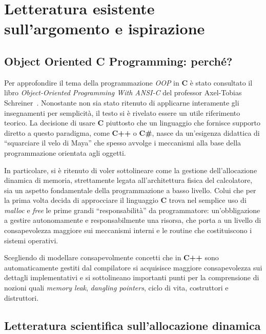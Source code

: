 \chapter{Letteratura esistente sull'argomento e ispirazione}
\section{Object Oriented C Programming: perché?}

Per approfondire il tema della programmazione \textit{OOP} in \textbf{C} è stato consultato il libro \textit{Object-Oriented Programming With ANSI-C} del professor Axel-Tobias Schreiner~\cite{schreiner1994}. Nonostante non sia stato ritenuto di applicarne interamente gli insegnamenti per semplicità, il testo si è rivelato essere un utile riferimento teorico. La decisione di usare \textbf{C} piuttosto che un linguaggio che fornisce supporto diretto a questo paradigma, come \textbf{C++} o \textbf{C\#}, nasce da un’esigenza didattica di ``squarciare il velo di Maya'' che spesso avvolge i meccanismi alla base della programmazione orientata agli oggetti.

In particolare, si è ritenuto di voler sottolineare come la gestione dell’allocazione dinamica di memoria, strettamente legata all’architettura fisica del calcolatore, sia un aspetto fondamentale della programmazione a basso livello. Colui che per la prima volta decida di approcciare il linguaggio \textbf{C} trova nel semplice uso di \textit{malloc} e \textit{free} le prime grandi ``responsabilità'' da programmatore: un’obbligazione a gestire autonomamente e responsabilmente una risorsa, che porta a un livello di consapevolezza maggiore sui meccanismi interni e le routine che costituiscono i sistemi operativi.

Scegliendo di modellare consapevolmente concetti che in \textbf{C++} sono automaticamente gestiti dal compilatore si acquisisce maggiore consapevolezza sui dettagli implementativi e si sottolineano importanti punti per la comprensione di nozioni quali \textit{memory leak}, \textit{dangling pointers}, ciclo di vita, costruttori e distruttori.

\section{Letteratura scientifica sull’allocazione dinamica}

